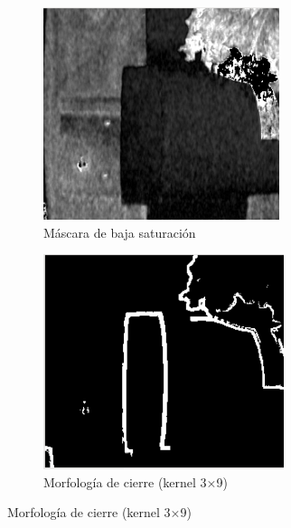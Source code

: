 \begin{figure}[H]
\vspace{0.3cm}

\begin{subfigure}[b]{0.48\textwidth}
    \centering
    \includegraphics[width=\textwidth]{imagenes/detector_tubos_3_canal_s.png}
    \caption{Máscara de baja saturación}
\end{subfigure}
\hfill
\begin{subfigure}[b]{0.48\textwidth}
    \centering
    \includegraphics[width=\textwidth]{imagenes/detector_tubos_5_morfologia.png}
    \caption{Morfología de cierre (kernel 3×9)}
\end{subfigure}


\end{figure}
